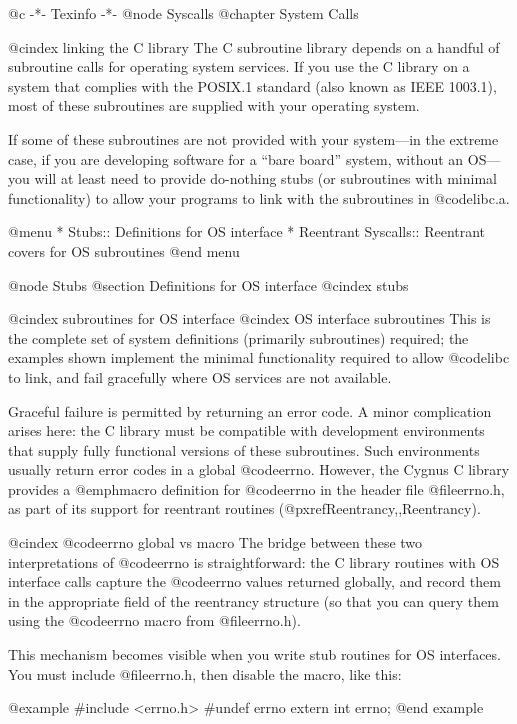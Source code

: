 @c                                           -*- Texinfo -*-
@node Syscalls
@chapter System Calls

@cindex linking the C library
The C subroutine library depends on a handful of subroutine calls for
operating system services.  If you use the C library on a system that
complies with the POSIX.1 standard (also known as IEEE 1003.1), most of
these subroutines are supplied with your operating system.

If some of these subroutines are not provided with your system---in
the extreme case, if you are developing software for a ``bare board''
system, without an OS---you will at least need to provide do-nothing
stubs (or subroutines with minimal functionality) to allow your
programs to link with the subroutines in @code{libc.a}.

@menu
* Stubs::		Definitions for OS interface
* Reentrant Syscalls::	Reentrant covers for OS subroutines
@end menu

@node Stubs
@section Definitions for OS interface
@cindex stubs

@cindex subroutines for OS interface
@cindex OS interface subroutines
This is the complete set of system definitions (primarily subroutines)
required; the examples shown implement the minimal functionality
required to allow @code{libc} to link, and fail gracefully where OS
services are not available.  

Graceful failure is permitted by returning an error code.  A minor
complication arises here: the C library must be compatible with
development environments that supply fully functional versions of these
subroutines.  Such environments usually return error codes in a global
@code{errno}.  However, the Cygnus C library provides a @emph{macro}
definition for @code{errno} in the header file @file{errno.h}, as part
of its support for reentrant routines (@pxref{Reentrancy,,Reentrancy}).

@cindex @code{errno} global vs macro
The bridge between these two interpretations of @code{errno} is
straightforward: the C library routines with OS interface calls
capture the @code{errno} values returned globally, and record them in
the appropriate field of the reentrancy structure (so that you can query
them using the @code{errno} macro from @file{errno.h}).

This mechanism becomes visible when you write stub routines for OS
interfaces.   You must include @file{errno.h}, then disable the macro,
like this:

@example
#include <errno.h>
#undef errno
extern int errno;
@end example


